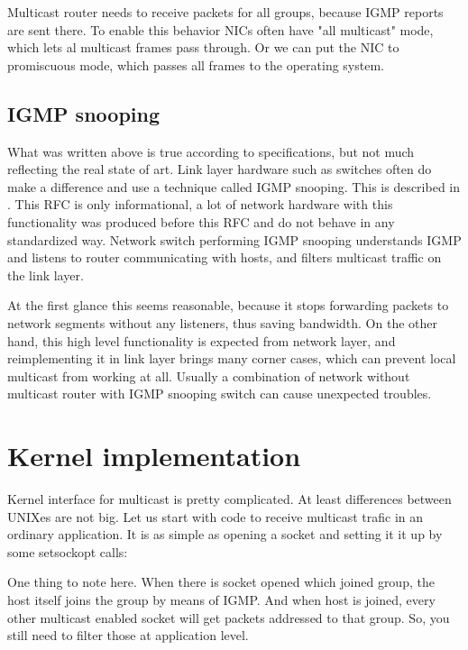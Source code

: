 Multicast router needs to receive packets for all groups, because IGMP reports
are sent there. To enable this behavior NICs often have "all multicast" mode,
which lets al multicast frames pass through. Or we can put the NIC to
promiscuous mode, which passes all frames to the operating system.

\subsection{IGMP snooping}

What was written above is true according to specifications, but not much
reflecting the real state of art. Link layer hardware such as switches often do
make a difference and use a technique called IGMP snooping. This is described
in . This RFC is only informational, a lot of network hardware with
this functionality was produced before this RFC and do not behave in any
standardized way. Network switch performing IGMP snooping understands IGMP and
listens to router communicating with hosts, and filters multicast traffic on
the link layer.

At the first glance this seems reasonable, because it stops forwarding packets
to network segments without any listeners, thus saving bandwidth. On the other
hand, this high level functionality is expected from network layer, and
reimplementing it in link layer brings many corner cases, which can prevent
local multicast from working at all. Usually a combination of network without
multicast router with IGMP snooping switch can cause unexpected troubles.

\section{Kernel implementation}

Kernel interface for multicast is pretty complicated. At least differences
between UNIXes are not big. Let us start with code to receive multicast trafic
in an ordinary application. It is as simple as opening a socket and setting it
it up by some setsockopt calls:


\noindent One thing to note here. When there is socket opened which joined group, the host
itself joins the group by means of IGMP. And when host is joined, every other
multicast enabled socket will get packets addressed to that group. So, you
still need to filter those at application level.

